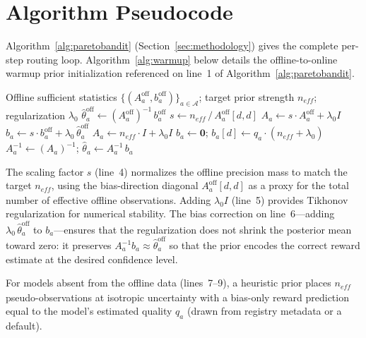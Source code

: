 %
%

\section{Algorithm Pseudocode}
\label{appendix:pseudocode}

Algorithm~\ref{alg:paretobandit} (Section~\ref{sec:methodology}) gives the complete per-step routing loop.  Algorithm~\ref{alg:warmup} below details the offline-to-online warmup prior initialization referenced on line~1 of Algorithm~\ref{alg:paretobandit}.

\begin{algorithm}[t]
\caption{Offline-to-Online Warmup Prior Initialization}
\label{alg:warmup}
\begin{algorithmic}[1]
\Require Offline sufficient statistics $\{(A_a^{\mathrm{off}}, b_a^{\mathrm{off}})\}_{a \in \mathcal{A}}$; target prior strength $n_\mathit{eff}$; regularization $\lambda_0$
        \State $\hat\theta_a^{\mathrm{off}} \leftarrow (A_a^{\mathrm{off}})^{-1}\, b_a^{\mathrm{off}}$ 
        \State $s \leftarrow n_\mathit{eff}\, \big/\, A_a^{\mathrm{off}}[d, d]$ 
        \State $A_a \leftarrow s \cdot A_a^{\mathrm{off}} + \lambda_0 I$ 
        \State $b_a \leftarrow s \cdot b_a^{\mathrm{off}} + \lambda_0\, \hat\theta_a^{\mathrm{off}}$ 
    \Else {}
        \State $A_a \leftarrow n_\mathit{eff} \cdot I + \lambda_0 I$
        \State $b_a \leftarrow \mathbf{0}$;\; $b_a[d] \leftarrow q_a \cdot (n_\mathit{eff} + \lambda_0)$ 
    \EndIf
    \State $A_a^{-1} \leftarrow (A_a)^{-1}$;\;\; $\hat\theta_a \leftarrow A_a^{-1}\, b_a$
\EndFor
\end{algorithmic}
\end{algorithm}

The scaling factor $s$ (line~4) normalizes the offline precision mass to match the target $n_\mathit{eff}$, using the bias-direction diagonal $A_a^{\mathrm{off}}[d, d]$ as a proxy for the total number of effective offline observations.  Adding $\lambda_0 I$ (line~5) provides Tikhonov regularization for numerical stability.  The bias correction on line~6---adding $\lambda_0\, \hat\theta_a^{\mathrm{off}}$ to $b_a$---ensures that the regularization does not shrink the posterior mean toward zero: it preserves $A_a^{-1} b_a \approx \hat\theta_a^{\mathrm{off}}$ so that the prior encodes the correct reward estimate at the desired confidence level.

For models absent from the offline data (lines~7--9), a heuristic prior places $n_\mathit{eff}$ pseudo-observations at isotropic uncertainty with a bias-only reward prediction equal to the model's estimated quality $q_a$ (drawn from registry metadata or a default).
